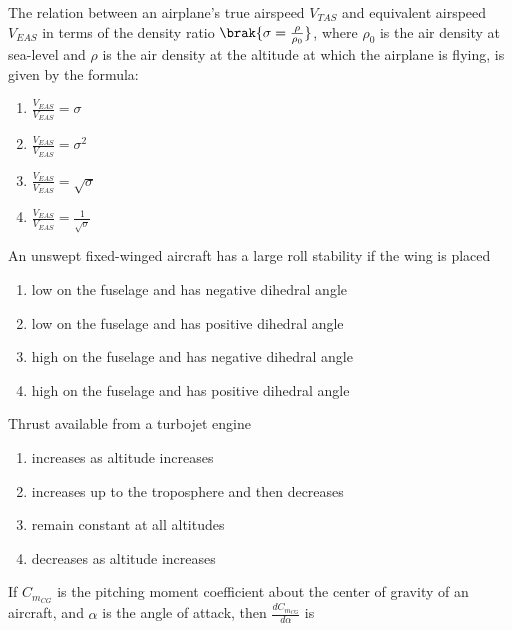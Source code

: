  \iffalse
\chapter{2009}
\author{EE24BTECH11021 - Eshan Ray}
\section{ae}
\fi
    \item The relation between an airplane's true airspeed $V_{TAS}$ and equivalent airspeed $V_{EAS}$  in terms of the density ratio $\brak{\sigma=\frac{\rho}{\rho_0}}$, where $\rho_0$ is the air density at sea-level and $\rho$ is the air density at the altitude at which the airplane is flying, is given by the formula$\colon$
    \begin{enumerate}
        \item $\frac{V_{EAS}}{V_{EAS}}=\sigma$
        \item $\frac{V_{EAS}}{V_{EAS}}=\sigma^2$
        \item $\frac{V_{EAS}}{V_{EAS}}=\sqrt{\sigma}$
        \item $\frac{V_{EAS}}{V_{EAS}}=\frac{1}{\sqrt{\sigma}}$
    \end{enumerate}
    \item An unswept fixed-winged aircraft has a large roll stability if the wing is placed 
    \begin{enumerate}
        \item low on the fuselage and has negative dihedral angle
        \item low on the fuselage and has positive dihedral angle
        \item high on the fuselage and has negative dihedral angle
        \item high on the fuselage and has positive dihedral angle
    \end{enumerate}
    \item Thrust available from a turbojet engine
    \begin{enumerate}
        \item increases as altitude increases
        \item increases up to the troposphere and then decreases
        \item remain constant at all altitudes
        \item decreases as altitude increases
    \end{enumerate}
    \item If $C_{m_{CG}}$ is the pitching moment coefficient about the center of gravity of an aircraft, and $\alpha$ is the angle of attack, then $\frac{dC_{m_{CG}}}{d\alpha}$ is
